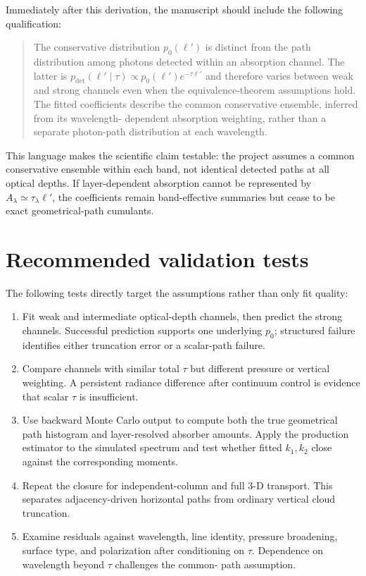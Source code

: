 \documentclass[11pt]{article}
\newcommand{\lp}{\ell'}
\begin{document}
Immediately after this derivation, the manuscript should include the following
qualification:

\begin{quote}
The conservative distribution $p_0(\lp)$ is distinct from the path
distribution among photons detected within an absorption channel.  The latter
is $p_{\mathrm{det}}(\lp\mid\tau)\propto
p_0(\lp)e^{-\tau\lp}$ and therefore varies between weak and strong channels
even when the equivalence-theorem assumptions hold.  The fitted coefficients
describe the common conservative ensemble, inferred from its wavelength-
dependent absorption weighting, rather than a separate photon-path
distribution at each wavelength.
\end{quote}

This language makes the scientific claim testable: the project assumes a
common conservative ensemble within each band, not identical detected paths at
all optical depths.  If layer-dependent absorption cannot be represented by
$A_\lambda\simeq\tau_\lambda\lp$, the coefficients remain band-effective
summaries but cease to be exact geometrical-path cumulants.

\section{Recommended validation tests}

The following tests directly target the assumptions rather than only fit
quality:
\begin{enumerate}
  \item Fit weak and intermediate optical-depth channels, then predict the
        strong channels.  Successful prediction supports one underlying
        $p_0$; structured failure identifies either truncation error or a
        scalar-path failure.
  \item Compare channels with similar total $\tau$ but different pressure or
        vertical weighting.  A persistent radiance difference after continuum
        control is evidence that scalar $\tau$ is insufficient.
  \item Use backward Monte Carlo output to compute both the true geometrical
        path histogram and layer-resolved absorber amounts.  Apply the
        production estimator to the simulated spectrum and test whether fitted
        $k_1,k_2$ close against the corresponding moments.
  \item Repeat the closure for independent-column and full 3-D transport.  This
        separates adjacency-driven horizontal paths from ordinary vertical
        cloud truncation.
  \item Examine residuals against wavelength, line identity, pressure
        broadening, surface type, and polarization after conditioning on
        $\tau$.  Dependence on wavelength beyond $\tau$ challenges the common-
        path assumption.
\end{enumerate}
\end{document}
